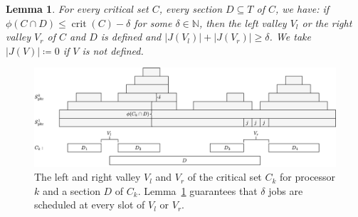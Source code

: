 \documentclass[a4paper]{article}
\DeclareMathOperator{\crit}{crit}
\newtheorem{lemma}[theorem]{Lemma}
\begin{document}
\begin{lemma}\label{lemma:valley}
  For every critical set $C$, every section $D \subseteq T$ of $C$, we have: if $\phi(C \cap D) \leq \crit(C) - \delta$ for some $\delta \in \mathbb{N}$, then the left valley $V_l$ or the right valley $V_r$ of $C$ and $D$ is defined and $|J(V_l)| + |J(V_r)| \geq \delta$.
  We take $|J(V)| \coloneqq 0$ if $V$ is not defined.
\end{lemma}
\begin{figure}[H]
  \centering
  \includegraphics[width=1\textwidth]{graphics/left_right_valleys.jpg}
  \caption{The left and right valley $V_l$ and $V_r$ of the critical set $C_k$ for processor $k$ and a section $D$ of $C_k$.
  Lemma~\ref{lemma:valley} guarantees that $\delta$ jobs are scheduled at every slot of $V_l$ or $V_r$.}\label{fig:left_right_valleys}
\end{figure}
\end{document}
